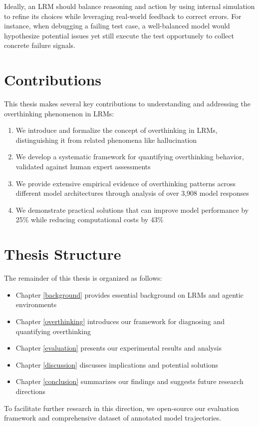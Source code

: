 Ideally, an LRM should balance reasoning and action by using internal simulation to refine its choices while leveraging real-world feedback to correct errors. For instance, when debugging a failing test case, a well-balanced model would hypothesize potential issues yet still execute the test opportunely to collect concrete failure signals.

\section{Contributions}
This thesis makes several key contributions to understanding and addressing the overthinking phenomenon in LRMs:

\begin{enumerate}
    \item We introduce and formalize the concept of overthinking in LRMs, distinguishing it from related phenomena like hallucination
    \item We develop a systematic framework for quantifying overthinking behavior, validated against human expert assessments
    \item We provide extensive empirical evidence of overthinking patterns across different model architectures through analysis of over 3,908 model responses
    \item We demonstrate practical solutions that can improve model performance by 25\% while reducing computational costs by 43\%
\end{enumerate}

\section{Thesis Structure}
The remainder of this thesis is organized as follows:

\begin{itemize}
    \item Chapter \ref{background} provides essential background on LRMs and agentic environments
    \item Chapter \ref{overthinking} introduces our framework for diagnosing and quantifying overthinking
    \item Chapter \ref{evaluation} presents our experimental results and analysis
    \item Chapter \ref{discussion} discusses implications and potential solutions
    \item Chapter \ref{conclusion} summarizes our findings and suggests future research directions
\end{itemize}

To facilitate further research in this direction, we open-source our evaluation framework and comprehensive dataset of annotated model trajectories.
